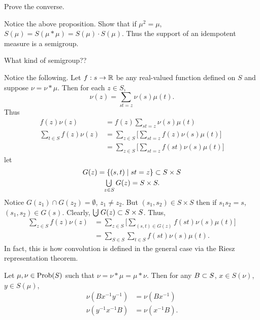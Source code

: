  Prove the converse.

Notice the above proposition.  
Show that if $\mu^2 = \mu$, $S(\mu) = S(\mu * \mu) = S(\mu) \cdot S(\mu)$.  
Thus the support of an idempotent measure is a semigroup.

 What kind of semigroup??

Notice the following.  
Let $f: s \to \mathbb{R}$ be any real-valued function defined on $S$ and suppose $\nu = \nu * \mu$.  
Then for each $z \in S$,
\[
     \nu(z) = \sum_{st=z} \nu(s) \mu(t).
\]
Thus
\[
\begin{aligned}
       f(z) \nu(z) &= f(z) \sum_{st=z} \nu(s) \mu(t)           \\
       \sum_{t\in S} f(z) \nu(z) &= \sum_{z\in S}
               \bigg[ \sum_{st=z} f(z) \nu(s) \mu(t) \bigg]    \\
       &= \sum_{z\in S}
               \bigg[ \sum_{st=z} f(st) \nu(s) \mu(t) \bigg]
\end{aligned}
\]
let
\[
\begin{gathered}
     G(z) = \{ (s,t) \mid st = z \} \ub S \times S     \\
     \bud_{z\in S} G(z) = S \times S.
\end{gathered}
\]
Notice $G(z_1) \cap G(z_2) = \emptyset$, $z_1 \not= z_2$.  But
$(s_1,s_2) \in S \times S$ then if $s_1s_2 = s$, $(s_1,s_2) \in G(s)$.
Clearly, $\bud G(z) \ub S \times S$.  Thus,
\[
\begin{aligned}
       \sum_{z\in S} f(z) \nu(z) &= \sum_{z\in S}
               \bigg[ \sum_{(s,t)\in G(z)} f(st)
                         \nu(s) \mu(t) \bigg]                  \\
       &= \sum_{S\in S} \sum_{t\in S} f(st) \nu(s) \mu(t).
\end{aligned}
\]
In fact, this is how convolution is defined in the general case via
the Riesz representation theorem.

\begin{lemma} 		\label{lem:3.1} 
Let $\mu,\nu \in \hbox{Prob}(S)$ such that $\nu = \nu * \mu = \mu * \nu$.  
Then for any $B \subset S$, $x \in S(\nu)$, $y \in S(\mu)$,
\[
\begin{aligned}
       \nu(Bx^{-1}y^{-1}) &= \nu(Bx^{-1})          \\
       \nu(y^{-1}x^{-1}B) &= \nu(x^{-1}B).
\end{aligned}
\]
\end{lemma}

